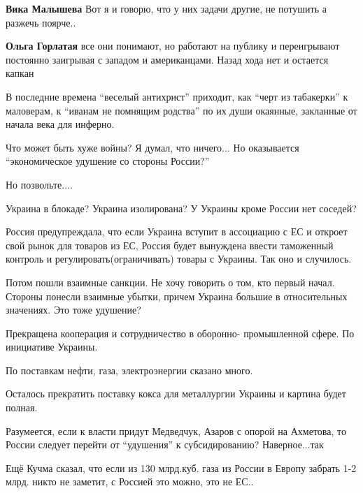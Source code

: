 \begin{itemize}
\begin{itemize}
\textbf{Вика Малышева} Вот я и говорю, что у них задачи другие, не потушить а разжечь поярче..

\textbf{Ольга Горлатая} все они понимают, но работают на публику и переигрывают постоянно заигрывая с западом и американцами. Назад хода нет и остается капкан
\end{itemize} %


В последние времена \enquote{веселый антихрист} приходит, как \enquote{черт из табакерки} к
маловерам, к \enquote{иванам не помнящим родства} по их души окаянные, закланные от
начала века для инферно.


Что может быть хуже войны? Я думал, что ничего... Но оказывается
\enquote{экономическое удушение со стороны России?}

Но позвольте....

Украина в блокаде? Украина изолирована? У Украины кроме России нет соседей?

Россия предупреждала, что если Украина вступит в ассоциацию с ЕС и откроет свой
рынок для товаров из ЕС, Россия будет вынуждена ввести таможенный контроль и
регулировать(ограничивать) товары с Украины. Так оно и случилось.

Потом пошли взаимные санкции. Не хочу говорить о том, кто первый начал. Стороны
понесли взаимные убытки, причем Украина большие в относительных значениях. Это
тоже удушение?

Прекращена кооперация и сотрудничество в оборонно- промышленной сфере. По
инициативе Украины.

По поставкам нефти, газа, электроэнергии сказано много.

Осталось прекратить поставку кокса для металлургии Украины и картина будет
полная.

Разумеется, если к власти придут Медведчук, Азаров с опорой на Ахметова, то
России следует перейти от \enquote{удушения} к субсидированию? Наверное...так

Ещё Кучма сказал, что если из 130 млрд.куб. газа из России в Европу забрать 1-2
млрд. никто не заметит, с Россией это можно, это не ЕС..


\end{itemize} %
